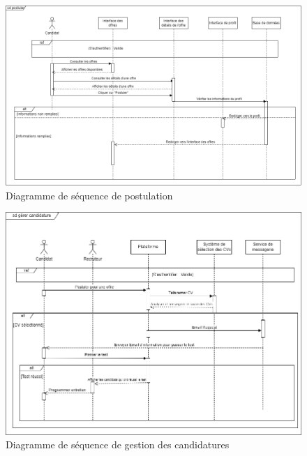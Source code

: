 \begin{figure}[htbp]
   \centering
   \includegraphics[scale=0.6]{Images/postuler.png} %
   \caption{Diagramme de séquence de postulation}
   \label{fig:seq3}
\end{figure}

\begin{figure}[htbp]
   \centering
   \includegraphics[scale=0.8]{Images/gererCandidature.png} %
   \caption{ Diagramme de séquence de gestion des candidatures}
   \label{fig:seq4}
\end{figure}

